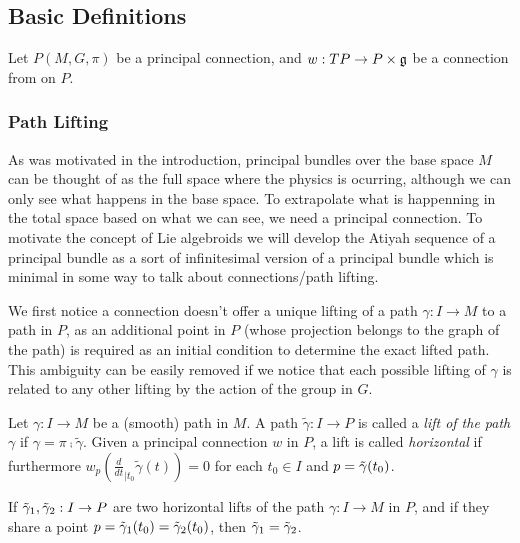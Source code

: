\subsection{Basic Definitions}

Let $P(M, G, \pi)$ be a principal connection, and $w : TP \to P \times \mathfrak{g}$ be a connection from on $P$.

\subsubsection{Path Lifting}

As was motivated in the introduction, principal bundles over the base space $M$ can be thought of as the full space where the  physics is ocurring, although we can only see what happens in the base space. To extrapolate what is happenning in the total space based on what we can see, we need a principal connection. To motivate the concept of Lie algebroids we will develop the Atiyah sequence of a principal bundle as a sort of infinitesimal version of a principal bundle which is minimal in some way to talk about connections/path lifting.

We first notice a connection doesn't offer a unique lifting of a path $\gamma:I \to M$ to a path in $P$, as an additional point in $P$ (whose projection belongs to the graph of the path) is required as an initial condition to determine the exact lifted path. This ambiguity can be easily removed if we notice that each possible lifting of $\gamma$ is related to any other lifting by the action of the group in $G$.

\begin{definition} 
Let $\gamma: I \to M$ be a (smooth) path in $M$. A path $\tilde{\gamma}: I \to P$ is called a \emph{lift of the path $\gamma$} if $\gamma = \pi \comp \tilde{\gamma}$. Given a principal connection $w$ in $P$, a lift is called \emph{horizontal} if furthermore $w_p(\frac{d}{dt}_{|t_0} \tilde{\gamma}(t)) = 0$ for each $t_0 \in I$ and $p = \Tilde{\gamma}(t_0)$.
\end{definition}

\begin{proposition} 
If $\Tilde{\gamma}_1, \Tilde{\gamma}_2:I \to P$ are two horizontal lifts of the path $\gamma:I \to M$ in $P$, and if they share a point $p = \Tilde{\gamma}_1(t_0) = \Tilde{\gamma}_2(t_0)$, then $\Tilde{\gamma}_1 = \Tilde{\gamma}_2$. 
\end{proposition}

